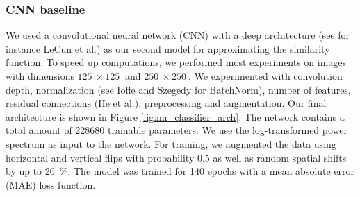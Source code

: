 \documentclass[10pt,conference,compsocconf]{IEEEtran}
\begin{document}
\subsubsection{CNN baseline} %
We used a convolutional neural network (CNN) with a deep architecture (see for instance LeCun et al.\@ \cite{DeepLearning}) as our second model for approximating the similarity function. To speed up computations, we performed most experiments on images with dimensions $\SI{125}{}\times\SI{125}{}$ and $\SI{250}{}\times\SI{250}{}$. We experimented with convolution depth, normalization (see Ioffe and Szegedy \cite{BatchNorm} for BatchNorm), number of features, residual connections (He et al.\@ \cite{ResNet}), preprocessing and augmentation.
Our final architecture is shown in Figure \ref{fig:nn_classifier_arch}. The network contains a total amount of \SI{228680}{} trainable parameters. We use the log-transformed power spectrum as input to the network. For training, we augmented the data using horizontal and vertical flips with probability \SI{0.5}{} as well as random spatial shifts by up to \SI{20}{\percent}. The model was trained for \SI{140}{} epochs with a mean absolute error (MAE) loss function. %
\end{document}
